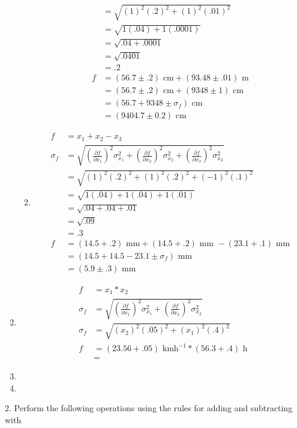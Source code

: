 \documentclass{article}
\begin{document}
\begin{enumerate}
\begin{enumerate}
\begin{align*}
&= \sqrt{(1)^2(.2)^2 + (1)^2(.01)^2}\\
&= \sqrt{1(.04) + 1(.0001)}\\
&= \sqrt{.04 + .0001}\\
&= \sqrt{.0401}\\
&= .2\\
f &= (56.7 \pm .2)\text{ cm} + (93.48 \pm .01)\text{ m}\\
&= (56.7 \pm .2)\text{ cm} + (9348 \pm 1)\text{ cm}\\
&= (56.7 + 9348 \pm \sigma_{f})\text{ cm}\\
&= (9404.7 \pm 0.2)\text{ cm}
\end{align*}
\item
\begin{align*}
f &= x_{1} + x_{2} - x_{3}\\
\sigma_{f} &= \sqrt{(\frac{\partial f}{\partial x_{1}})^2\sigma_{x_{1}}^2 + (\frac{\partial f}{\partial x_{2}})^2\sigma_{x_{2}}^2 + (\frac{\partial f}{\partial x_{3}})^2\sigma_{x_{3}}^2}\\
&= \sqrt{(1)^2(.2)^2 + (1)^2(.2)^2 + (-1)^2(.1)^2}\\
&= \sqrt{1(.04) + 1(.04) + 1(.01)}\\
&= \sqrt{.04 + .04 + .01}\\
&= \sqrt{.09}\\
&= .3\\
f &= (14.5 + .2)\text{ mm} + (14.5 + .2)\text{ mm } - (23.1 + .1)\text{ mm}\\
&= (14.5 + 14.5 - 23.1 \pm \sigma_{f})\text{ mm}\\
&= (5.9 \pm .3)\text{ mm}
\end{align*}
\end{enumerate}
\item
\begin{align*}
f &= x_{1} * x_{2}\\
\sigma_{f} &= \sqrt{(\frac{\partial f}{\partial x_{1}})^2\sigma_{x_{1}}^2 + (\frac{\partial f}{\partial x_{2}})^2\sigma_{x_{2}}^2}\\
\sigma_{f} &= \sqrt{(x_{2})^2(.05)^2 + (x_{1})^2(.4)^2}\\
f &= (23.56 + .05)\text{ kmh}^{-1} * (56.3 + .4)\text{ h}\\
&= 
\end{align*}
\item
\item
\end{enumerate}



2. Perform the following operations using the rules for adding and subtracting with 
\end{document}
